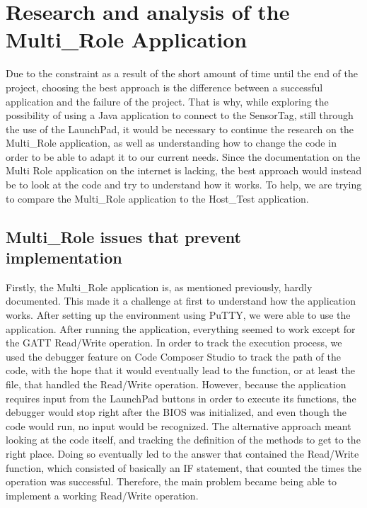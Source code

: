 \documentclass[12pt]{article}
\begin{document}
\section{Research and analysis of the Multi\_Role Application}
Due to the constraint as a result of the short amount of time until the end of the project, choosing the best approach is the difference between a successful application and the failure of the project. That is why, while exploring the possibility of using a Java application to connect to the SensorTag, still through the use of the LaunchPad, it would be necessary to continue the research on the Multi\_Role application, as well as understanding how to change the code in order to be able to adapt it to our current needs. Since the documentation on the Multi Role application on the internet is lacking, the best approach would instead be to look at the code and try to understand how it works. To help, we are trying to compare the Multi\_Role application to the Host\_Test application.\\

\subsection{Multi\_Role issues that prevent implementation}
Firstly, the Multi\_Role application is, as mentioned previously, hardly documented. This made it a challenge at first to understand how the application works. After setting up the environment using PuTTY, we were able to use the application. After running the application, everything seemed to work except for the GATT Read/Write operation. In order to track the execution process, we used the debugger feature on Code Composer Studio to track the path of the code, with the hope that it would eventually lead to the function, or at least the file, that handled the Read/Write operation. However, because the application requires input from the LaunchPad buttons in order to execute its functions, the debugger would stop right after the BIOS was initialized, and even though the code would run, no input would be recognized. The alternative approach meant looking at the code itself, and tracking the definition of the methods to get to the right place. Doing so eventually led to the answer that contained the Read/Write function, which consisted of basically an IF statement, that counted the times the operation was successful. Therefore, the main problem became being able to implement a working Read/Write operation.\\
\end{document}
